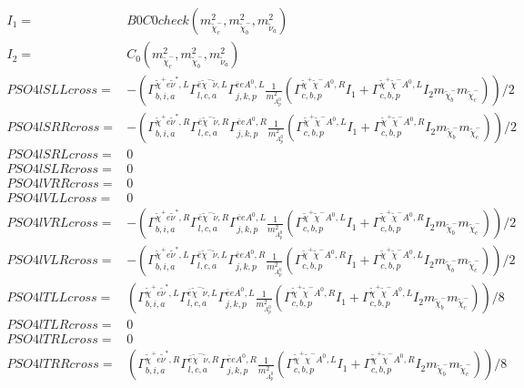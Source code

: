 \documentclass[A4,landscape]{article}
\begin{document}
\begin{align} 
I_1= & B0C0check(m^2_{\tilde{\chi}^-_{{c}}}, m^2_{\tilde{\chi}^-_{{b}}}, m^2_{\tilde{\nu}_{{a}}}) \\ 
I_2= & C_0(m^2_{\tilde{\chi}^-_{{c}}}, m^2_{\tilde{\chi}^-_{{b}}}, m^2_{\tilde{\nu}_{{a}}}) \\ 
  PSO4lSLLcross= & -( \Gamma^{\tilde{\chi}^+e \tilde{\nu}^*,L}_{b, i, a} \Gamma^{\bar{e}\tilde{\chi}^- \tilde{\nu} ,L}_{l, c, a} \Gamma^{\bar{e}e A^0 ,L}_{j, k, p} \frac{1}{m^2_{A^0_{{p}}}} (\Gamma^{\tilde{\chi}^+\tilde{\chi}^- A^0 ,R}_{c, b, p} I_1 + \Gamma^{\tilde{\chi}^+\tilde{\chi}^- A^0 ,L}_{c, b, p} I_2 m_{\tilde{\chi}^-_{{b}}} m_{\tilde{\chi}^-_{{c}}}))/2 \\ 
  PSO4lSRRcross= & -( \Gamma^{\tilde{\chi}^+e \tilde{\nu}^*,R}_{b, i, a} \Gamma^{\bar{e}\tilde{\chi}^- \tilde{\nu} ,R}_{l, c, a} \Gamma^{\bar{e}e A^0 ,R}_{j, k, p} \frac{1}{m^2_{A^0_{{p}}}} (\Gamma^{\tilde{\chi}^+\tilde{\chi}^- A^0 ,L}_{c, b, p} I_1 + \Gamma^{\tilde{\chi}^+\tilde{\chi}^- A^0 ,R}_{c, b, p} I_2 m_{\tilde{\chi}^-_{{b}}} m_{\tilde{\chi}^-_{{c}}}))/2 \\ 
  PSO4lSRLcross= & 0 \\ 
  PSO4lSLRcross= & 0 \\ 
  PSO4lVRRcross= & 0 \\ 
  PSO4lVLLcross= & 0 \\ 
  PSO4lVRLcross= & -( \Gamma^{\tilde{\chi}^+e \tilde{\nu}^*,R}_{b, i, a} \Gamma^{\bar{e}\tilde{\chi}^- \tilde{\nu} ,R}_{l, c, a} \Gamma^{\bar{e}e A^0 ,L}_{j, k, p} \frac{1}{m^2_{A^0_{{p}}}} (\Gamma^{\tilde{\chi}^+\tilde{\chi}^- A^0 ,L}_{c, b, p} I_1 + \Gamma^{\tilde{\chi}^+\tilde{\chi}^- A^0 ,R}_{c, b, p} I_2 m_{\tilde{\chi}^-_{{b}}} m_{\tilde{\chi}^-_{{c}}}))/2 \\ 
  PSO4lVLRcross= & -( \Gamma^{\tilde{\chi}^+e \tilde{\nu}^*,L}_{b, i, a} \Gamma^{\bar{e}\tilde{\chi}^- \tilde{\nu} ,L}_{l, c, a} \Gamma^{\bar{e}e A^0 ,R}_{j, k, p} \frac{1}{m^2_{A^0_{{p}}}} (\Gamma^{\tilde{\chi}^+\tilde{\chi}^- A^0 ,R}_{c, b, p} I_1 + \Gamma^{\tilde{\chi}^+\tilde{\chi}^- A^0 ,L}_{c, b, p} I_2 m_{\tilde{\chi}^-_{{b}}} m_{\tilde{\chi}^-_{{c}}}))/2 \\ 
  PSO4lTLLcross= & ( \Gamma^{\tilde{\chi}^+e \tilde{\nu}^*,L}_{b, i, a} \Gamma^{\bar{e}\tilde{\chi}^- \tilde{\nu} ,L}_{l, c, a} \Gamma^{\bar{e}e A^0 ,L}_{j, k, p} \frac{1}{m^2_{A^0_{{p}}}} (\Gamma^{\tilde{\chi}^+\tilde{\chi}^- A^0 ,R}_{c, b, p} I_1 + \Gamma^{\tilde{\chi}^+\tilde{\chi}^- A^0 ,L}_{c, b, p} I_2 m_{\tilde{\chi}^-_{{b}}} m_{\tilde{\chi}^-_{{c}}}))/8 \\ 
  PSO4lTLRcross= & 0 \\ 
  PSO4lTRLcross= & 0 \\ 
  PSO4lTRRcross= & ( \Gamma^{\tilde{\chi}^+e \tilde{\nu}^*,R}_{b, i, a} \Gamma^{\bar{e}\tilde{\chi}^- \tilde{\nu} ,R}_{l, c, a} \Gamma^{\bar{e}e A^0 ,R}_{j, k, p} \frac{1}{m^2_{A^0_{{p}}}} (\Gamma^{\tilde{\chi}^+\tilde{\chi}^- A^0 ,L}_{c, b, p} I_1 + \Gamma^{\tilde{\chi}^+\tilde{\chi}^- A^0 ,R}_{c, b, p} I_2 m_{\tilde{\chi}^-_{{b}}} m_{\tilde{\chi}^-_{{c}}}))/8 \\ 
\end{align} 
\end{document}
